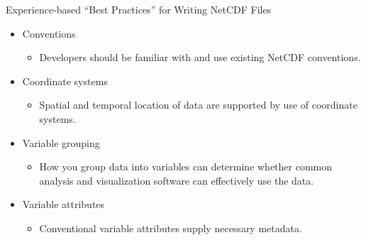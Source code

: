 \documentclass[compress,11pt,xcolor=svgnames,aspectratio=169]{beamer}
\begin{document}
\begin{frame}[fragile]{Experience-based ``Best Practices'' for Writing NetCDF Files}

    \begin{itemize}
    \setlength\itemsep{0.4cm}

        \item	Conventions
        \begin{itemize}
          \item Developers should be familiar with and use existing NetCDF conventions.
        \end{itemize}

        \item	Coordinate systems
        \begin{itemize}
          \item Spatial and temporal location of data are supported by use of coordinate systems.
        \end{itemize}

        \item	Variable grouping
        \begin{itemize}
          \item How you group data into variables can determine whether common analysis and visualization software can effectively use the data.
        \end{itemize}

        \item	Variable attributes
        \begin{itemize}
          \item Conventional variable attributes supply necessary metadata.
        \end{itemize}

    \end{itemize}

\nocite{netcdf}

\end{frame}
\end{document}

